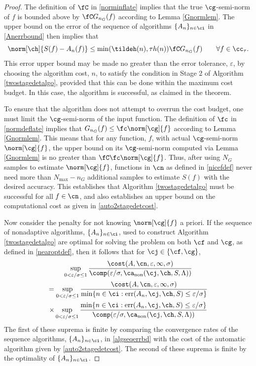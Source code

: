 \documentclass[]{elsarticle}
\DeclareMathOperator{\fix}{non}
\DeclareMathOperator{\err}{err}
\theoremstyle{definition}
\theoremstyle{remark}
\begin{document}
\begin{proof} The definition of $\fC$ in \eqref{norminflate} implies that the true $\cg$-semi-norm of $f$ is bounded above by $\fC G_{n_G}(f)$ according to Lemma \ref{Gnormlem}.  The upper bound on the error of the sequence of algorithms $\{A_n\}_{n \in \ci}$ in \eqref{Anerrbound} then implies that 
\[
\norm[\ch]{S(f) -  A_n(f)} \le \min(\tildeh(n),\tau h(n)) \fC G_{n_G}(f) \qquad \forall f \in \cc_{\tau}.
\]
This error upper bound may be made no greater than the error tolerance, $\varepsilon$, by choosing the algorithm cost, $n$, to satisfy the condition in Stage 2 of Algorithm \ref{twostagedetalgo}, provided that this can be done within the maximum cost budget.  In this case, the algorithm is successful, as claimed in the theorem.

To ensure that the algorithm does not attempt to overrun the cost budget, one must limit the $\cg$-semi-norm of the input function.  The definition of  $\fc$ in \eqref{normdeflate} implies that $G_{n_G}(f) \le \fc\norm[\cg]{f}$ according to Lemma \ref{Gnormlem}. This means that for any function, $f$, with actual $\cg$-semi-norm $\norm[\cg]{f}$, the upper bound on its $\cg$-semi-norm computed via Lemma \ref{Gnormlem} is no greater than $\fC \fc \norm[\cg]{f}$.  Thus, after using $N_G$ samples to estimate $\norm[\cg]{f}$, functions in $\cn$ as defined in \eqref{nicefdef} never need more than $N_{\max} - n_G$ additional samples to estimate $S(f)$ with the desired accuracy.  This establishes that Algorithm \ref{twostagedetalgo} must be successful for all $f \in \cn$, and also establishes an upper bound on the computational cost as given in \eqref{auto2stagedetcost}.

Now consider the penalty for not knowing $\norm[\cg]{f}$ a priori.  If the sequence of nonadaptive algorithms, $\{A_n\}_{n \in \ci}$, used to construct Algorithm \ref{twostagedetalgo} are optimal for solving the problem on both $\cf$ and $\cg$, as defined in \eqref{nearoptdef}, then it follows that for $\cj \in \{\cf,\cg\}$,
\begin{multline*}
\sup_{0 < \varepsilon/\sigma \le 1} \frac{\cost(A,\cn,\varepsilon,\infty,\sigma)} {\comp(\varepsilon/\sigma,\ca_{\fix}(\cj,\ch,S,\Lambda))} \\
= \sup_{0 < \varepsilon/\sigma \le 1} \frac{\cost(A,\cn,\varepsilon,\infty,\sigma)}{\min\{n \in \ci : \err(A_n,\cj,\ch,S) \le \varepsilon/\sigma\}} \\
 \times \sup_{0 < \varepsilon/\sigma \le 1} \frac{\min\{n \in \ci : \err(A_n,\cj,\ch,S) \le \varepsilon/\sigma\}} {\comp(\varepsilon/\sigma,\ca_{\fix}(\cj,\ch,S,\Lambda))}
\end{multline*} 
The first of these suprema is finite by comparing the convergence rates of the sequence algorithms, $\{A_n\}_{n \in \ci}$, in \eqref{algseqerrbd} with the cost of the automatic algorithm given by \eqref{auto2stagedetcost}. The second of these suprema is finite by the optimality of $\{A_n\}_{n \in \ci}$.  
\end{proof}
\end{document}
